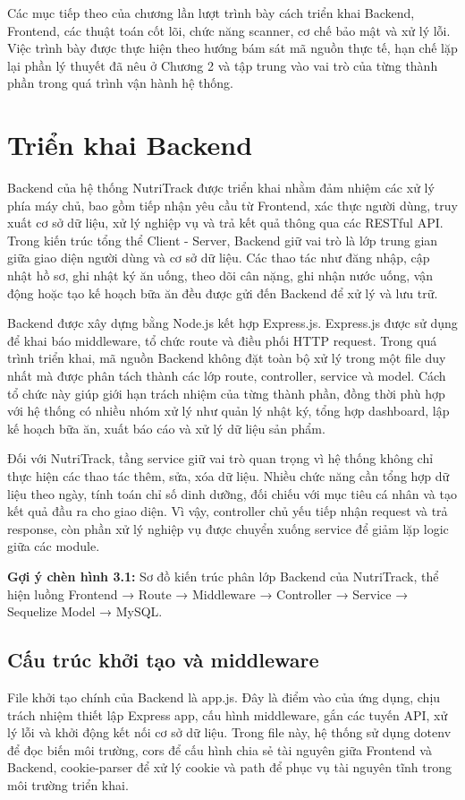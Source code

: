 \documentclass[12pt, a4paper]{report}
\begin{document}
Các mục tiếp theo của chương lần lượt trình bày cách triển khai Backend, Frontend, các thuật toán cốt lõi, chức năng scanner, cơ chế bảo mật và xử lý lỗi. Việc trình bày được thực hiện theo hướng bám sát mã nguồn thực tế, hạn chế lặp lại phần lý thuyết đã nêu ở Chương 2 và tập trung vào vai trò của từng thành phần trong quá trình vận hành hệ thống.

\section{Triển khai Backend}Backend của hệ thống NutriTrack được triển khai nhằm đảm nhiệm các xử lý phía máy chủ, bao gồm tiếp nhận yêu cầu từ Frontend, xác thực người dùng, truy xuất cơ sở dữ liệu, xử lý nghiệp vụ và trả kết quả thông qua các RESTful API. Trong kiến trúc tổng thể Client - Server, Backend giữ vai trò là lớp trung gian giữa giao diện người dùng và cơ sở dữ liệu. Các thao tác như đăng nhập, cập nhật hồ sơ, ghi nhật ký ăn uống, theo dõi cân nặng, ghi nhận nước uống, vận động hoặc tạo kế hoạch bữa ăn đều được gửi đến Backend để xử lý và lưu trữ.

Backend được xây dựng bằng Node.js kết hợp Express.js. Express.js được sử dụng để khai báo middleware, tổ chức route và điều phối HTTP request. Trong quá trình triển khai, mã nguồn Backend không đặt toàn bộ xử lý trong một file duy nhất mà được phân tách thành các lớp route, controller, service và model. Cách tổ chức này giúp giới hạn trách nhiệm của từng thành phần, đồng thời phù hợp với hệ thống có nhiều nhóm xử lý như quản lý nhật ký, tổng hợp dashboard, lập kế hoạch bữa ăn, xuất báo cáo và xử lý dữ liệu sản phẩm.

Đối với NutriTrack, tầng service giữ vai trò quan trọng vì hệ thống không chỉ thực hiện các thao tác thêm, sửa, xóa dữ liệu. Nhiều chức năng cần tổng hợp dữ liệu theo ngày, tính toán chỉ số dinh dưỡng, đối chiếu với mục tiêu cá nhân và tạo kết quả đầu ra cho giao diện. Vì vậy, controller chủ yếu tiếp nhận request và trả response, còn phần xử lý nghiệp vụ được chuyển xuống service để giảm lặp logic giữa các module.

\textbf{Gợi ý chèn hình 3.1:} Sơ đồ kiến trúc phân lớp Backend của NutriTrack, thể hiện luồng Frontend → Route → Middleware → Controller → Service → Sequelize Model → MySQL.

\subsection{Cấu trúc khởi tạo và middleware}File khởi tạo chính của Backend là app.js. Đây là điểm vào của ứng dụng, chịu trách nhiệm thiết lập Express app, cấu hình middleware, gắn các tuyến API, xử lý lỗi và khởi động kết nối cơ sở dữ liệu. Trong file này, hệ thống sử dụng dotenv để đọc biến môi trường, cors để cấu hình chia sẻ tài nguyên giữa Frontend và Backend, cookie-parser để xử lý cookie và path để phục vụ tài nguyên tĩnh trong môi trường triển khai.
\end{document}
